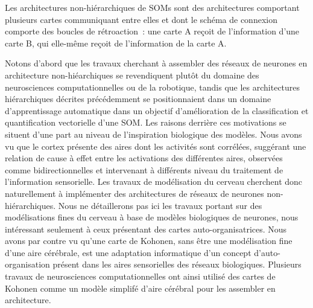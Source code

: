 \documentclass[../main]{subfiles}
\begin{document}
Les architectures non-hiérarchiques de SOMs sont des architectures comportant plusieurs cartes communiquant entre elles et dont le schéma de connexion comporte des boucles de rétroaction~: une carte A reçoit de l'information d'une carte B, qui elle-même reçoit de l'information de la carte A.


Notons d'abord que les travaux cherchant à assembler des réseaux de neurones en architecture non-hiéarchiques se revendiquent plutôt du domaine des neurosciences computationnelles ou de la robotique, tandis que les architectures hiérarchiques décrites précédemment se positionnaient dans un domaine d'apprentissage automatique dans un objectif d'amélioration de la classification et quantification vectorielle d'une SOM.
Les raisons derrière ces motivations se situent d'une part au niveau de l'inspiration biologique des modèles. 
Nous avons vu que le cortex présente des aires dont les activités sont corrélées, suggérant une relation de cause à effet entre les activations des différentes aires, observées comme bidirectionnelles et intervenant à différents niveau du traitement de l'information sensorielle.
Les travaux de modélisation du cerveau cherchent donc naturellement à implémenter des architectures de réseaux de neurones non-hiérarchiques. 
Nous ne détaillerons pas ici les travaux portant sur des modélisations fines du cerveau à base de modèles biologiques de neurones, nous intéressant seulement à ceux présentant des cartes auto-organisatrices.
Nous avons par contre vu qu'une carte de Kohonen, sans être une modélisation fine d'une aire cérébrale, est une adaptation informatique d'un concept d'auto-organisation présent dans les aires sensorielles des réseaux biologiques. Plusieurs travaux de neurosciences computationnelles ont ainsi utilisé des cartes de Kohonen comme un modèle simplifé d'aire cérébral pour les assembler en architecture.
\end{document}
